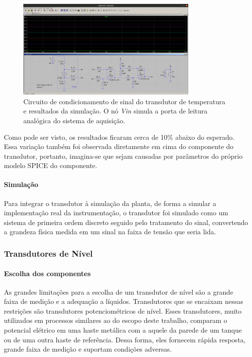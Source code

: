 \begin{figure}[H]
    \centering
    \includegraphics[width=0.8\textwidth]{imagens/temp_circ.png}
    \caption{Circuito de condicionamento de sinal do transdutor de temperatura e resultados da simulação. O nó \emph{Vin} simula a porta de leitura analógica do sistema de aquisição.}
    \label{fig:imagens-temp_circ-png}
\end{figure}

Como pode ser visto, os resultados ficaram cerca de 10\% abaixo do esperado. Essa variação também foi observada diretamente em cima do componente do transdutor, portanto, imagina-se que sejam causadas por parâmetros do próprio modelo SPICE do componente.

\paragraph{Simulação}\mbox{}

Para integrar o transdutor à simulação da planta, de forma a simular a implementação real da instrumentação, o transdutor foi simulado como um sistema de primeira ordem discreto seguido pelo tratamento do sinal, convertendo a grandeza física medida em um sinal na faixa de tensão que seria lida.

\subsubsection{Transdutores de Nível}

\paragraph{Escolha dos componentes}\mbox{}

As grandes limitações para a escolha de um transdutor de nível são a grande faixa de medição e a adequação a líquidos. Transdutores que se encaixam nessas restrições são transdutores potenciométricos de nível. Esses transdutores, muito utilizados em processos similares ao do escopo deste trabalho, comparam o potencial elétrico em uma haste metálica com a aquele da parede de um tanque ou de uma outra haste de referência. Dessa forma, eles fornecem rápida resposta, grande faixa de medição e suportam condições adversas.

